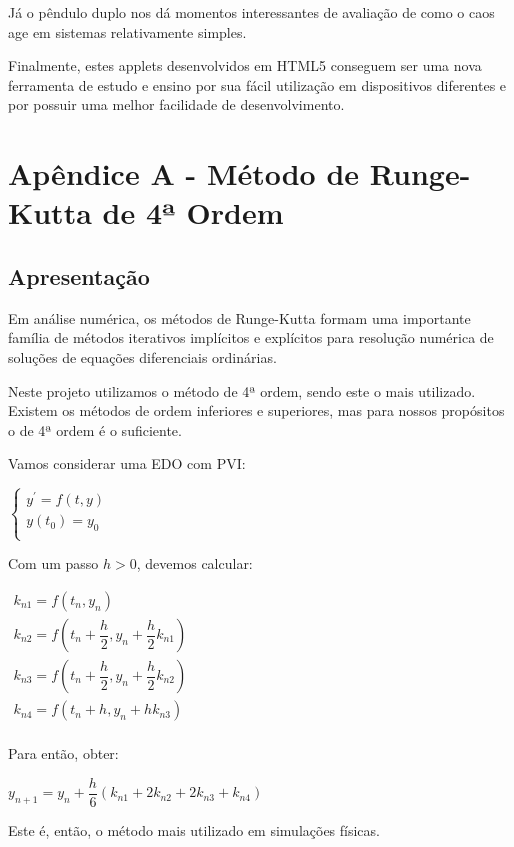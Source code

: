 \documentclass[13pt,a4paper]{report}
\begin{document}
Já o pêndulo duplo nos dá momentos interessantes de avaliação de como o caos age em sistemas relativamente simples.

Finalmente, estes applets desenvolvidos em HTML5 conseguem ser uma nova ferramenta de estudo e ensino por sua fácil utilização em dispositivos diferentes e por possuir uma melhor facilidade de desenvolvimento.
\clearpage

\chapter*{Apêndice A - Método de Runge-Kutta de 4ª Ordem}
\section*{Apresentação}

Em análise numérica, os métodos de Runge-Kutta formam uma importante família de métodos iterativos implícitos e explícitos para resolução numérica de soluções de equações diferenciais ordinárias.

Neste projeto utilizamos o método de 4ª ordem, sendo este o mais utilizado. Existem os métodos de ordem inferiores e superiores, mas para nossos propósitos o de 4ª ordem é o suficiente.

Vamos considerar uma EDO com PVI:
\begin{center}
$
\left \{
\begin{array}{l}
y^{'} = f(t,y) \\
y(t_{0}) = y_{0} \\
\end{array}
\right.
$
\end{center}
Com um passo $h > 0$, devemos calcular:
\begin{center}
$
\begin{array}{l}
k_{n1} = f(t_{n},y_{n}) \\
k_{n2} = f(t_{n} + \dfrac{h}{2} ,y_{n} + \dfrac{h}{2}k_{n1}) \\[3mm]
k_{n3} = f(t_{n} + \dfrac{h}{2} ,y_{n} + \dfrac{h}{2}k_{n2}) \\[3mm]
k_{n4} = f(t_{n} + h,y_{n} + hk_{n3}) \\
\end{array}
$
\end{center}
Para então, obter:
\begin{center}
$
y_{n + 1} = y_{n} + \dfrac{h}{6}\left( k_{n1} + 2k_{n2} + 2k_{n3} + k_{n4} \right)
$
\end{center}
Este é, então, o método mais utilizado em simulações físicas.
\clearpage
\end{document}
